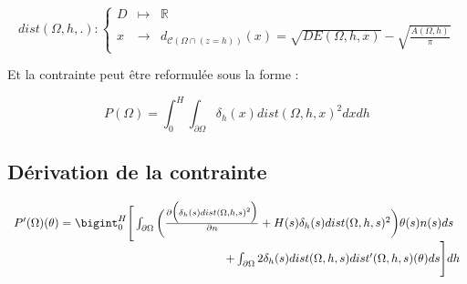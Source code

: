 \documentclass[11pt,a4paper]{article}
\begin{document}
\begin{equation}
\label{eq:dist2}
dist(\Omega,h,.):\left\{\begin{array}{lll}
D & \mapsto & \mathbb{R} \\
x & \rightarrow & d_{\mathcal{C}(\Omega\cap (z=h))}(x)=\sqrt{DE(\Omega,h,x)}-\sqrt{\frac{A(\Omega,h)}{\pi}}
\end{array}
\right.
\end{equation}

Et la contrainte peut être reformulée sous la forme :

\begin{equation}
\label{eq:constraint2}
P(\Omega)=\int_{0}^{H}\int_{\partial\Omega}\delta_h(x)dist(\Omega,h,x)^2dxdh
\end{equation}


\subsection*{Dérivation de la contrainte}
\begin{equation}
\begin{array}{l}
P'(\Omega)(\theta)=\bigint_{0}^{H}\Bigg[\int_{\partial\Omega}\bigg(\frac{\partial\Big(\delta_h(s)dist(\Omega,h,s)^2\Big)}{\partial n}+H(s)\delta_h(s)dist(\Omega,h,s)^2\bigg)\theta(s)n(s)ds \\
\qquad \qquad \qquad \qquad \qquad \qquad \qquad \qquad \qquad +\int_{\partial\Omega}2\delta_h(s)dist(\Omega,h,s)dist'(\Omega,h,s)(\theta)ds\Bigg]dh
\end{array}
\end{equation}
\end{document}
